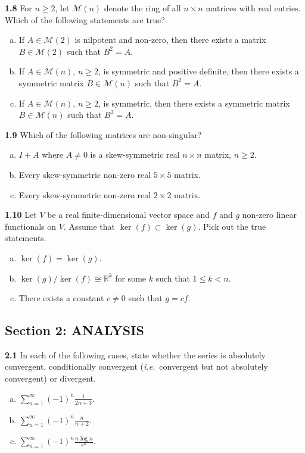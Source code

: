 \documentclass[11pt,a4paper]{article}
\newcommand{\R}{\mathbb{R}}
\newcommand{\examsec}[1]{%
  \subsection*{#1}
  \vspace{-2pt}
}
\newcommand{\qitem}[1]{\par\medskip\noindent\textbf{#1}\hspace{0.5em}}
\begin{document}
\qitem{1.8} For $n \ge 2$, let $\mathcal{M}(n)$ denote the ring of all $n \times n$ matrices with real entries. Which of the following statements are true?
\begin{enumerate}[a.]
  \item If $A \in \mathcal{M}(2)$ is nilpotent and non-zero, then there exists a matrix $B \in \mathcal{M}(2)$ such that $B^2 = A$.
  \item If $A \in \mathcal{M}(n)$, $n \ge 2$, is symmetric and positive definite, then there exists a symmetric matrix $B \in \mathcal{M}(n)$ such that $B^2 = A$.
  \item If $A \in \mathcal{M}(n)$, $n \ge 2$, is symmetric, then there exists a symmetric matrix $B \in \mathcal{M}(n)$ such that $B^3 = A$.
\end{enumerate}

\qitem{1.9} Which of the following matrices are non-singular?
\begin{enumerate}[a.]
  \item $I + A$ where $A \neq 0$ is a skew-symmetric real $n \times n$ matrix, $n \ge 2$.
  \item Every skew-symmetric non-zero real $5 \times 5$ matrix.
  \item Every skew-symmetric non-zero real $2 \times 2$ matrix.
\end{enumerate}

\qitem{1.10} Let $V$ be a real finite-dimensional vector space and $f$ and $g$ non-zero linear functionals on $V$. Assume that $\ker(f) \subset \ker(g)$. Pick out the true statements.
\begin{enumerate}[a.]
  \item $\ker(f) = \ker(g)$.
  \item $\ker(g)/\ker(f) \cong \R^k$ for some $k$ such that $1 \le k < n$.
  \item There exists a constant $c \neq 0$ such that $g = cf$.
\end{enumerate}

\examsec{Section 2: ANALYSIS}

\qitem{2.1} In each of the following cases, state whether the series is absolutely convergent, conditionally convergent (\emph{i.e.}\ convergent but not absolutely convergent) or divergent.
\begin{enumerate}[a.]
  \item $\displaystyle\sum_{n=1}^{\infty} (-1)^n \frac{1}{2n+3}$.
  \item $\displaystyle\sum_{n=1}^{\infty} (-1)^n \frac{n}{n+2}$.
  \item $\displaystyle\sum_{n=1}^{\infty} (-1)^n \frac{n\log n}{e^n}$.
\end{enumerate}
\end{document}

